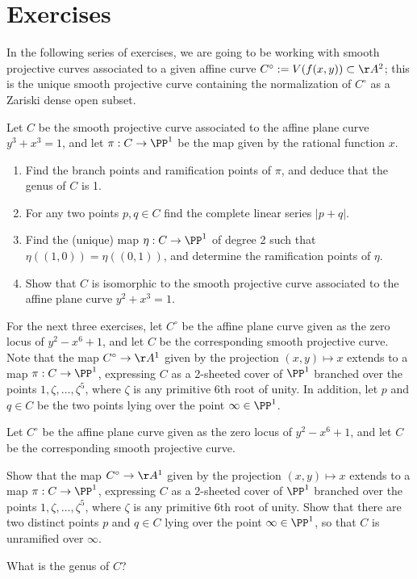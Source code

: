 \section{Exercises}

In the following series of exercises, we are going to be working with smooth projective curves associated to a given affine curve $C^\circ := V(f(x,y)) \subset \AA^2$; this is the unique smooth projective curve containing the normalization of $C^\circ$ as a Zariski dense open subset.

\begin{exercise}
Let $C$ be the smooth projective curve associated to the affine plane curve $y^3 +x^3 = 1$, and let $\pi : C \to \PP^1$ be the map given by the rational function $x$.
\begin{enumerate}
\item Find the branch points and ramification points of $\pi$, and deduce that the genus of $C$ is 1.
\item For any two points $p, q \in C$ find the complete linear series $|p+q|$.
\item Find the (unique) map $\eta : C \to \PP^1$ of degree 2 such that $\eta((1,0)) = \eta((0,1))$, and determine the ramification points of $\eta$.
\item Show that $C$ is isomorphic to the smooth projective curve associated to the affine plane curve $y^2 +x^3 = 1$.
\end{enumerate}
\end{exercise}

For the next three exercises, let $C^\circ$ be the affine plane curve given as the zero locus of $y^2 - x^6 +1$, and let $C$ be the corresponding smooth projective curve. Note that the map $C^\circ \to \AA^1$ given by the projection $(x,y) \mapsto x$ extends to a map $\pi : C \to \PP^1$, expressing $C$ as a 2-sheeted cover of $\PP^1$ branched over the points $1, \zeta, \dots, \zeta^5$, where $\zeta$ is any primitive 6th root of unity. In addition, let $p$ and $q \in C$ be the two points lying over the point $\infty \in \PP^1$.

\begin{exercise}\label{hyperelliptic curve 1}
Let $C^\circ$ be the affine plane curve given as the zero locus of $y^2 - x^6 +1$, and let $C$ be the corresponding smooth projective curve. 

Show  that the map $C^\circ \to \AA^1$ given by the projection $(x,y) \mapsto x$ extends to a map $\pi : C \to \PP^1$, expressing $C$ as a 2-sheeted cover of $\PP^1$ branched over the points $1, \zeta, \dots, \zeta^5$, where $\zeta$ is any primitive 6th root of unity. Show that there are two distinct points $p$ and $q \in C$  lying over the point $\infty \in \PP^1$,
so that $C$ is unramified over $\infty$.

What is the genus of $C$?
\end{exercise}

